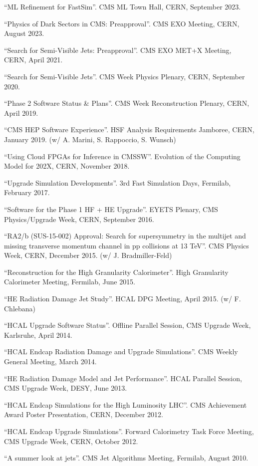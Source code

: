 \begin{description}[leftmargin=12pt,font=\normalfont,labelsep=0em]
\item ``ML Refinement for FastSim''. CMS ML Town Hall, CERN, September 2023.
\item ``Physics of Dark Sectors in CMS: Preapproval''. CMS EXO Meeting, CERN, August 2023.
\item ``Search for Semi-Visible Jets: Preapproval''. CMS EXO MET+X Meeting, CERN, April 2021.
\item ``Search for Semi-Visible Jets''. CMS Week Physics Plenary, CERN, September 2020.
\item ``Phase 2 Software Status \& Plans''. CMS Week Reconstruction Plenary, CERN, April 2019.
\item ``CMS HEP Software Experience''. HSF Analysis Requirements Jamboree, CERN, January 2019. (w/ A. Marini, S. Rappoccio, S. Wunsch)
\item ``Using Cloud FPGAs for Inference in CMSSW''. Evolution of the Computing Model for 202X, CERN, November 2018.
\item ``Upgrade Simulation Developments''. 3rd Fast Simulation Days, Fermilab, February 2017.
\item ``Software for the Phase 1 HF + HE Upgrade''. EYETS Plenary, CMS Physics/Upgrade Week, CERN, September 2016.
\item ``RA2/b (SUS-15-002) Approval: Search for supersymmetry in the multijet and missing transverse momentum channel in pp collisions at 13 TeV''. CMS Physics Week, CERN, December 2015. (w/ J. Bradmiller-Feld)
\item ``Reconstruction for the High Granularity Calorimeter''. High Granularity Calorimeter Meeting, Fermilab, June 2015.
\item ``HE Radiation Damage Jet Study''. HCAL DPG Meeting, April 2015. (w/ F. Chlebana)
\item ``HCAL Upgrade Software Status''. Offline Parallel Session, CMS Upgrade Week, Karlsruhe, April 2014.
\item ``HCAL Endcap Radiation Damage and Upgrade Simulations''. CMS Weekly General Meeting, March 2014.
\item ``HE Radiation Damage Model and Jet Performance''. HCAL Parallel Session, CMS Upgrade Week, DESY, June 2013.
\item ``HCAL Endcap Simulations for the High Luminosity LHC''. CMS Achievement Award Poster Presentation, CERN, December 2012.
\item ``HCAL Endcap Upgrade Simulations''. Forward Calorimetry Task Force Meeting, CMS Upgrade Week, CERN, October 2012.
\item ``A summer look at jets''. CMS Jet Algorithms Meeting, Fermilab, August 2010.
\end{description}
\fi
